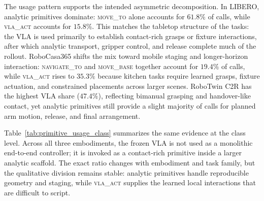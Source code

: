 \documentclass[11pt]{article}
\begin{document}
The usage pattern supports the intended asymmetric decomposition. In LIBERO, analytic primitives dominate: \textsc{move\_to} alone accounts for $61.8\%$ of calls, while \textsc{vla\_act} accounts for $15.8\%$. This matches the tabletop structure of the tasks: the VLA is used primarily to establish contact-rich grasps or fixture interactions, after which analytic transport, gripper control, and release complete much of the rollout. RoboCasa365 shifts the mix toward mobile staging and longer-horizon interaction: \textsc{navigate\_to} and \textsc{move\_base} together account for $19.4\%$ of calls, while \textsc{vla\_act} rises to $35.3\%$ because kitchen tasks require learned grasps, fixture actuation, and constrained placements across larger scenes. RoboTwin C2R has the highest VLA share ($47.4\%$), reflecting bimanual grasping and handover-like contact, yet analytic primitives still provide a slight majority of calls for planned arm motion, release, and final arrangement.

Table~\ref{tab:primitive_usage_class} summarizes the same evidence at the class level. Across all three embodiments, the frozen VLA is not used as a monolithic end-to-end controller; it is invoked as a contact-rich primitive inside a larger analytic scaffold. The exact ratio changes with embodiment and task family, but the qualitative division remains stable: analytic primitives handle reproducible geometry and staging, while \textsc{vla\_act} supplies the learned local interactions that are difficult to script.
\end{document}
